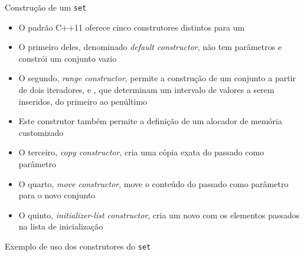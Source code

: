 \begin{frame}[fragile]{Construção de um \texttt{set}}

    \begin{itemize}
        \item O padrão C++11 oferece cinco construtores distintos para um 

        \item O primeiro deles, denominado \textit{default constructor},
                 não tem parâmetros e constrói um conjunto vazio

        \item O segundo, \textit{range constructor}, permite a construção de um conjunto a partir 
            de dois iteradores,
             e , que determinam um intervalo de valores a 
            serem inseridos, do primeiro ao penúltimo

        \item Este construtor também permite a definição de um alocador de memória customizado

        \item O terceiro, \textit{copy constructor}, cria uma cópia exata do 
            passado como parâmetro

        \item O quarto, \textit{move constructor}, move o conteúdo do  passado
            como parâmetro para o novo conjunto

        \item O quinto, \textit{initializer-list constructor}, cria um novo  com
            os elementos passados na lista de inicialização
    \end{itemize}

\end{frame}

\begin{frame}[fragile]{Exemplo de uso dos construtores do \texttt{set}}


\end{frame}

